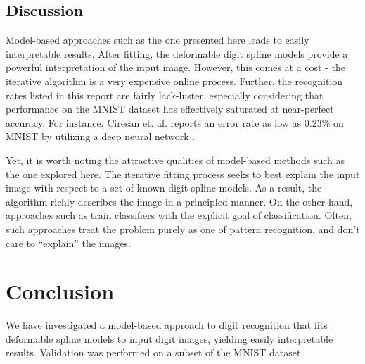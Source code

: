 \documentclass[oribibl]{llncs}
\begin{document}
\subsection{Discussion}

Model-based approaches such as the one presented here leads to easily interpretable results.
After fitting, the deformable digit spline models provide a powerful interpretation of the input image.
However, this comes at a cost - the iterative algorithm is a very expensive online process.
Further, the recognition rates listed in this report are fairly lack-luster, especially considering that performance on the MNIST dataset has effectively saturated at near-perfect accuracy.
For instance, Ciresan et. al. reports an error rate as low as 0.23\% on MNIST by utilizing a deep neural network \cite{ciresan}.

Yet, it is worth noting the attractive qualities of model-based methods such as the one explored here.  
The iterative fitting process seeks to best explain the input image with respect to a set of known digit spline models.
As a result, the algorithm richly describes the image in a principled manner.
On the other hand, approaches such as \cite{ciresan} train classifiers with the explicit goal of classification.
Often, such approaches treat the problem purely as one of pattern recognition, and don't care to ``explain'' the images.

\section{Conclusion}

We have investigated a model-based approach to digit recognition that fits deformable spline models to input digit images, yielding easily interpretable results.
Validation was performed on a subset of the MNIST dataset.

 

\end{document}
